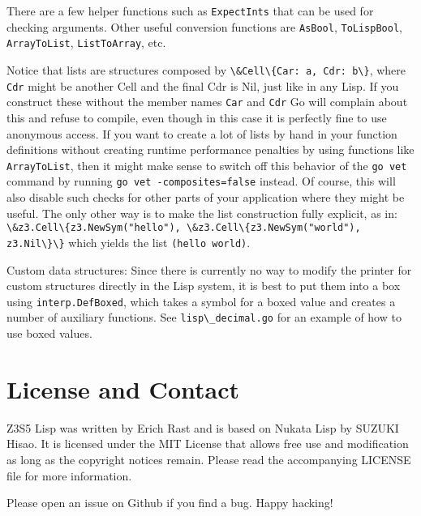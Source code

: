 \documentclass[
]{article}
\newcommand{\passthrough}[1]{#1}
\begin{document}
There are a few helper functions such as
\passthrough{\lstinline!ExpectInts!} that can be used for checking
arguments. Other useful conversion functions are
\passthrough{\lstinline!AsBool!}, \passthrough{\lstinline!ToLispBool!},
\passthrough{\lstinline!ArrayToList!},
\passthrough{\lstinline!ListToArray!}, etc.

Notice that lists are structures composed by
\passthrough{\lstinline!\&Cell\{Car: a, Cdr: b\}!}, where
\passthrough{\lstinline!Cdr!} might be another Cell and the final Cdr is
Nil, just like in any Lisp. If you construct these without the member
names \passthrough{\lstinline!Car!} and \passthrough{\lstinline!Cdr!} Go
will complain about this and refuse to compile, even though in this case
it is perfectly fine to use anonymous access. If you want to create a
lot of lists by hand in your function definitions without creating
runtime performance penalties by using functions like
\passthrough{\lstinline!ArrayToList!}, then it might make sense to
switch off this behavior of the \passthrough{\lstinline!go vet!} command
by running \passthrough{\lstinline!go vet -composites=false!} instead.
Of course, this will also disable such checks for other parts of your
application where they might be useful. The only other way is to make
the list construction fully explicit, as in:
\passthrough{\lstinline!\&z3.Cell\{z3.NewSym("hello"), \&z3.Cell\{z3.NewSym("world"), z3.Nil\}\}!}
which yields the list \passthrough{\lstinline!(hello world)!}.

Custom data structures: Since there is currently no way to modify the
printer for custom structures directly in the Lisp system, it is best to
put them into a box using \passthrough{\lstinline!interp.DefBoxed!},
which takes a symbol for a boxed value and creates a number of auxiliary
functions. See \passthrough{\lstinline!lisp\_decimal.go!} for an example
of how to use boxed values.

\hypertarget{license-and-contact}{%
\section{License and Contact}\label{license-and-contact}}

Z3S5 Lisp was written by Erich Rast and is based on Nukata Lisp by
SUZUKI Hisao. It is licensed under the MIT License that allows free use
and modification as long as the copyright notices remain. Please read
the accompanying LICENSE file for more information.

Please open an issue on Github if you find a bug. Happy hacking!
\end{document}
